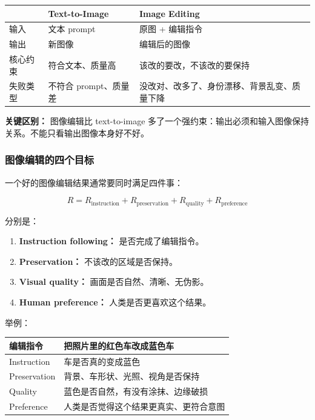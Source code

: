\begin{center}
{\small
\begin{tabular}{p{3cm}p{4.8cm}p{4.8cm}}
\hline
 & \textbf{Text-to-Image} & \textbf{Image Editing} \\
\hline
输入
&
文本 prompt
&
原图 + 编辑指令
\\
输出
&
新图像
&
编辑后的图像
\\
核心约束
&
符合文本、质量高
&
该改的要改，不该改的要保持
\\
失败类型
&
不符合 prompt、质量差
&
没改对、改多了、身份漂移、背景乱变、质量下降
\\
\hline
\end{tabular}
}
\end{center}

\begin{warnbox}
\textbf{关键区别：} 图像编辑比 text-to-image 多了一个强约束：输出必须和输入图像保持关系。不能只看输出图像本身好不好。
\end{warnbox}

\subsubsection{图像编辑的四个目标}

一个好的图像编辑结果通常要同时满足四件事：

\[
R
=
R_\text{instruction}
+
R_\text{preservation}
+
R_\text{quality}
+
R_\text{preference}
\]

分别是：

\begin{enumerate}[leftmargin=1.5em]
  \item \textbf{Instruction following：} 是否完成了编辑指令。
  \item \textbf{Preservation：} 不该改的区域是否保持。
  \item \textbf{Visual quality：} 画面是否自然、清晰、无伪影。
  \item \textbf{Human preference：} 人类是否更喜欢这个结果。
\end{enumerate}

举例：

\begin{center}
{\small
\begin{tabular}{p{3cm}p{9.8cm}}
\hline
\textbf{编辑指令} & 把照片里的红色车改成蓝色车 \\
\hline
Instruction & 车是否真的变成蓝色 \\
Preservation & 背景、车形状、光照、视角是否保持 \\
Quality & 蓝色是否自然，有没有涂抹、边缘破损 \\
Preference & 人类是否觉得这个结果更真实、更符合意图 \\
\hline
\end{tabular}
}
\end{center}

